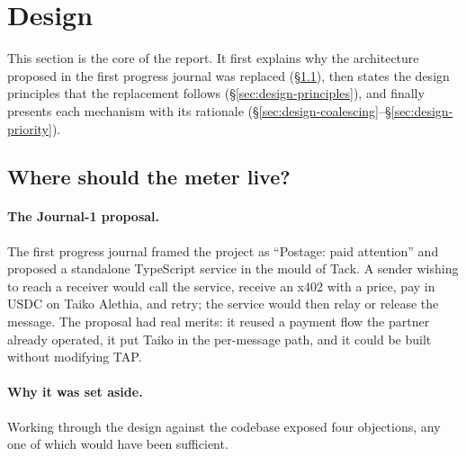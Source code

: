 \section{Design}
\label{sec:design}

This section is the core of the report. It first explains why the architecture proposed
in the first progress journal was replaced (\S\ref{sec:design-pivot}), then states the
design principles that the replacement follows (\S\ref{sec:design-principles}), and
finally presents each mechanism with its rationale
(\S\ref{sec:design-coalescing}--\S\ref{sec:design-priority}).

\subsection{Where should the meter live?}
\label{sec:design-pivot}

\paragraph{The Journal-1 proposal.}
The first progress journal framed the project as ``Postage: paid attention'' and proposed
a standalone TypeScript service in the mould of Tack. A sender wishing to reach a receiver
would call the service, receive an x402  with a price, pay in
USDC on Taiko Alethia, and retry; the service would then relay or release the message.
The proposal had real merits: it reused a payment flow the partner already operated, it
put Taiko in the per-message path, and it could be built without modifying TAP.

\paragraph{Why it was set aside.}
Working through the design against the codebase exposed four objections, any one of
which would have been sufficient.

